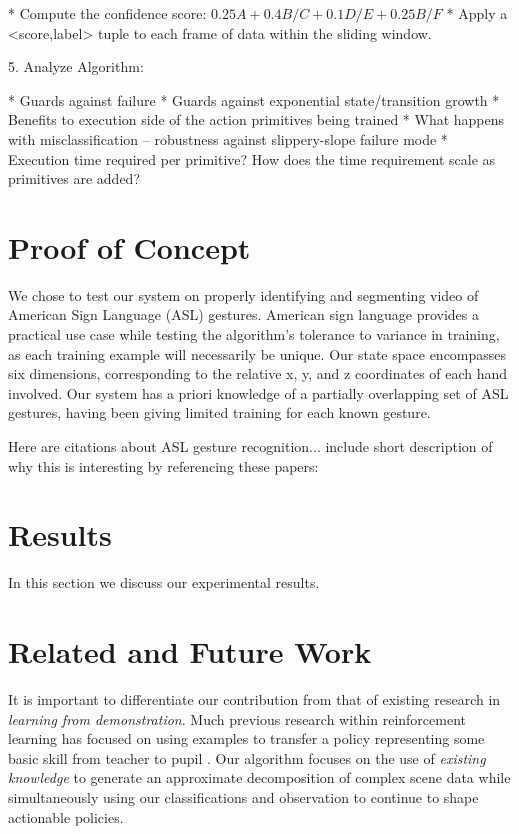 \documentclass[letterpaper]{article}
\begin{document}
			* Compute the confidence score: $0.25A + 0.4B/C + 0.1D/E + 0.25B/F$
			* Apply a <score,label> tuple to each frame of data within the sliding window.



5. Analyze Algorithm:

	* Guards against failure
	* Guards against exponential state/transition growth
	* Benefits to execution side of the action primitives being trained
	* What happens with misclassification -- robustness against slippery-slope failure mode
	* Execution time required per primitive? How does the time requirement scale as primitives are added?

\section{Proof of Concept}
\label{sec:proofofconcept}
We chose to test our system on properly identifying and segmenting video of American Sign Language (ASL) gestures.
American sign language provides a practical use case while testing the algorithm's tolerance to variance in training, as each training 
example will necessarily be unique. Our state space encompasses six dimensions, corresponding to the relative x, y, and z coordinates of each hand involved.
Our system has a priori knowledge of a partially overlapping set of ASL gestures, having been giving limited training for each known gesture.

Here are citations about ASL gesture recognition... include short description of why this is interesting by referencing these papers:
\cite{HandGestures}\cite{HSMMRecognition}\cite{POMDPGesture}
\cite{HoughASL}\cite{ASLRealTime}\cite{MotionASL}



\section{Results}
\label{sec:result}
In this section we discuss our experimental results.

\section{Related and Future Work}
\label{sec:future}
It is important to differentiate our contribution from that of
existing research in \textit{learning from demonstration}.  Much previous research within reinforcement learning has focused on using examples to
transfer a policy representing some basic skill from teacher to
pupil \cite{JenkinsLFD,LFDSurvey}.  Our algorithm focuses on the use of
\textit{existing knowledge} to generate an approximate decomposition of
complex scene data while simultaneously using our classifications and observation to continue to shape actionable policies.
\end{document}
